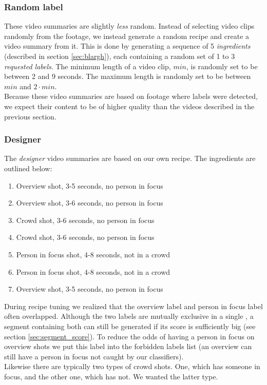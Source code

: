 \subsubsection{Random label}
%
These video summaries are slightly \textit{less} random. Instead of selecting video clips randomly from the footage, we instead generate a random recipe and create a video summary from it. This is done by generating a sequence of 5 \textit{ingredients} (described in section \ref{sec:blargh}), each containing a random set of 1 to 3 \textit{requested labels}. The minimum length of a video clip, $min$, is randomly set to be between 2 and 9 seconds. The maximum length is randomly set to be between $min$ and $2 \cdot min$.\\
Because these video summaries are based on footage where labels were detected, we expect their content to be of higher quality than the videos described in the previous section.
%
\subsubsection{Designer}\label{sec:phase4designer}
%
The \textit{designer} video summaries are based on our own recipe. The ingredients are outlined below:
\begin{enumerate}
\item Overview shot, 3-5 seconds, no person in focus
\item Overview shot, 3-6 seconds, no person in focus
\item Crowd shot, 3-6 seconds, no person in focus
\item Crowd shot, 3-6 seconds, no person in focus
\item Person in focus shot, 4-8 seconds, not in a crowd
\item Person in focus shot, 4-8 seconds, not in a crowd
\item Overview shot, 3-5 seconds, no person in focus
\end{enumerate}
%
%
%
%
%
%
%
%
During recipe tuning we realized that the overview label and person in focus label often overlapped. Although the two labels are mutually exclusive in a single 
, a segment containing both can still be generated if its score is sufficiently big (see section \ref{sec:segment_score}). To reduce the odds of having a person in focus on overview shots we put this label into the forbidden labels list (an overview can still have a person in focus not caught by our classifiers).\\
Likewise there are typically two types of crowd shots. One, which has someone in focus, and the other one, which has not. We wanted the latter type.
%
